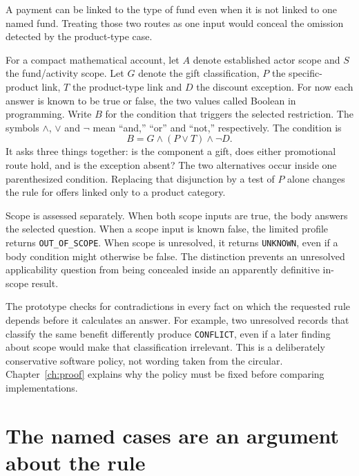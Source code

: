 \documentclass[12pt,a4paper,oneside,openany]{book}
\begin{document}
A payment can be linked to the type of fund even when it is not linked to one named fund. Treating those two routes as one input would conceal the omission detected by the product-type case.


For a compact mathematical account, let $A$ denote established actor scope and
$S$ the fund/activity scope. Let $G$ denote the gift classification, $P$ the
specific-product link, $T$ the product-type link and $D$ the discount exception.
For now each answer is known to be true or false, the two values called Boolean
in programming. Write $B$ for the condition that triggers the selected
restriction. The symbols $\land$, $\lor$ and $\neg$ mean ``and,'' ``or'' and
``not,'' respectively. The condition is
\begin{equation}
 B=G\land(P\lor T)\land\neg D.
 \label{eq:gift-body}
\end{equation}
It asks three things together: is the component a gift, does either promotional
route hold, and is the exception absent? The two alternatives occur inside one
parenthesized condition. Replacing that disjunction by a test of $P$ alone
changes the rule for offers linked only to a product category.

Scope is assessed separately. When both scope inputs are true, the body answers
the selected question. When a scope input is known false, the limited profile
returns \texttt{OUT\_OF\_SCOPE}. When scope is unresolved, it returns
\texttt{UNKNOWN}, even if a body condition might otherwise be false. The
distinction prevents an unresolved applicability question from being concealed
inside an apparently definitive in-scope result.

The prototype checks for contradictions in every fact on which the requested
rule depends before it calculates an answer. For example, two unresolved records
that classify the same benefit differently produce \texttt{CONFLICT}, even if a
later finding about scope would make that classification irrelevant. This is a
deliberately conservative software policy, not wording taken from the circular.
Chapter~\ref{ch:proof} explains why the policy must be fixed before comparing
implementations.

\section{The named cases are an argument about the rule}
\label{merge:M02:03}
\end{document}
